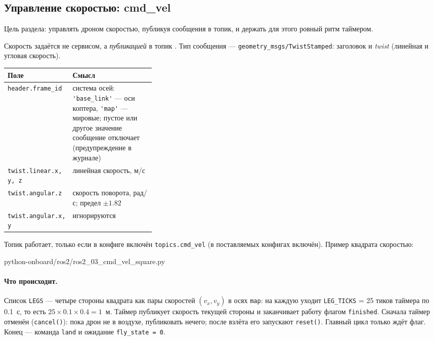 \subsection{Управление скоростью: cmd\_vel}
\label{sec:ros2-cmdvel}

Цель раздела: управлять дроном скоростью, публикуя сообщения в топик, и держать для этого ровный ритм таймером.

Скорость задаётся не сервисом, а \emph{публикацией} в топик . Тип сообщения --- \texttt{geometry\_msgs/\allowbreak TwistStamped}: заголовок и \emph{twist} (линейная и угловая скорость).

\begin{center}
\small
\begin{tabularx}{\linewidth}{@{}>{\raggedright\arraybackslash}p{0.34\linewidth} X@{}}
\toprule
\textbf{Поле} & \textbf{Смысл} \\
\midrule
\verb|header.frame_id| & система осей: \verb|'base_link'| --- оси коптера, \verb|'map'| --- мировые; пустое или другое значение сообщение отключает (предупреждение в журнале) \\
\verb|twist.linear.x, y, z| & линейная скорость, м/с \\
\verb|twist.angular.z| & скорость поворота, рад/с; предел $\pm 1.82$ \\
\verb|twist.angular.x, y| & игнорируются \\
\bottomrule
\end{tabularx}
\end{center}

Топик работает, только если в конфиге включён \verb|topics.cmd_vel| (в поставляемых конфигах включён). Пример квадрата скоростью:

\begin{codefile}[python]{python-onboard/ros2/ros2_03_cmd_vel_square.py}
\end{codefile}

\paragraph{Что происходит.} Список \verb|LEGS| --- четыре стороны квадрата как пары скоростей $(v_x, v_y)$ в осях \verb|map|: на каждую уходит \verb|LEG_TICKS| = 25 тиков таймера по 0.1~с, то есть $25 \times 0.1 \times 0.4 = 1$~м. Таймер публикует скорость текущей стороны и заканчивает работу флагом \verb|finished|. Сначала таймер отменён (\verb|cancel()|): пока дрон не в воздухе, публиковать нечего; после взлёта его запускают \verb|reset()|. Главный цикл только ждёт флаг. Конец --- команда \verb|land| и ожидание \verb|fly_state = 0|.

